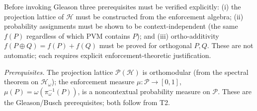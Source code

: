 \documentclass[11pt]{article}
\theoremstyle{remark}
\begin{document}
Before invoking Gleason three prerequisites must be verified explicitly: (i) the projection lattice of $\mathcal{H}$ must be constructed from the enforcement algebra; (ii) probability assignments must be shown to be context-independent (the same $f(P)$ regardless of which PVM contains $P$); and (iii) ortho-additivity $f(P \oplus Q) = f(P) + f(Q)$ must be proved for orthogonal $P, Q$.  These are not automatic; each requires explicit enforcement-theoretic justification.

\smallskip\noindent\textit{Prerequisites.}  The projection lattice $\mathcal{P}(\mathcal{H})$ is orthomodular (from the spectral theorem on $\mathcal{H}_\omega$); the enforcement measure $\mu: \mathcal{P} \to [0,1]$, $\mu(P) = \omega(\pi_\omega^{-1}(P))$, is a noncontextual probability measure on $\mathcal{P}$.  These are the Gleason/Busch prerequisites; both follow from T2.
\end{document}
